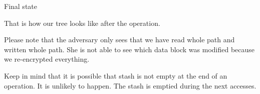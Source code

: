 	\exampleFrame%
		{Final state}
		{
			\selectedtrue%
			\pathreadtrue%
			\nodeonenewtrue%
			\nodetwonewtrue%
			\nodethreenewtrue%
			\nodefournewtrue%
		}
		{}
		{}
		{
			That is how our tree looks like after the operation.

			Please note that the adversary only sees that we have read whole path and written whole path.
			She is not able to see which data block was modified because we re-encrypted everything.

			Keep in mind that it is possible that stash is not empty at the end of an operation.
			It is unlikely to happen.
			The stash is emptied during the next accesses.
		}
